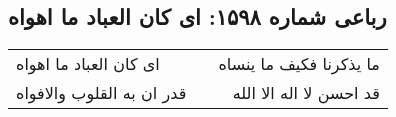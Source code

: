 \begin{center}
\section*{رباعی شماره ۱۵۹۸: ای کان العباد ما اهواه}
\label{sec:1598}
\begin{longtable}{l p{0.5cm} r}
ای کان العباد ما اهواه
&&
ما یذکرنا فکیف ما ینساه
\\
قدر ان به القلوب والافواه
&&
قد احسن لا اله الا الله
\\
\end{longtable}
\end{center}
